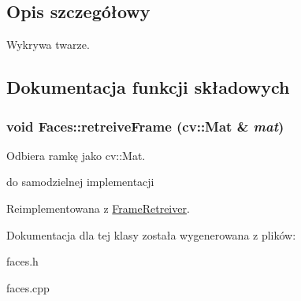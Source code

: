 \subsection{Opis szczegółowy}
Wykrywa twarze. 

\subsection{Dokumentacja funkcji składowych}
\hypertarget{class_faces_7fd92e73e117b72898097551b964fd96}{
\subsubsection[{retreiveFrame}]{\setlength{\rightskip}{0pt plus 5cm}void Faces::retreiveFrame (cv::Mat \& {\em mat})}}
\label{class_faces_7fd92e73e117b72898097551b964fd96}


Odbiera ramkę jako cv::Mat. 

do samodzielnej implementacji 

Reimplementowana z \hyperlink{class_frame_retreiver_72912583af45c00d267f215a0d0b9bb1}{FrameRetreiver}.

Dokumentacja dla tej klasy została wygenerowana z plików:\begin{CompactItemize}
\item 
faces.h\item 
faces.cpp\end{CompactItemize}
